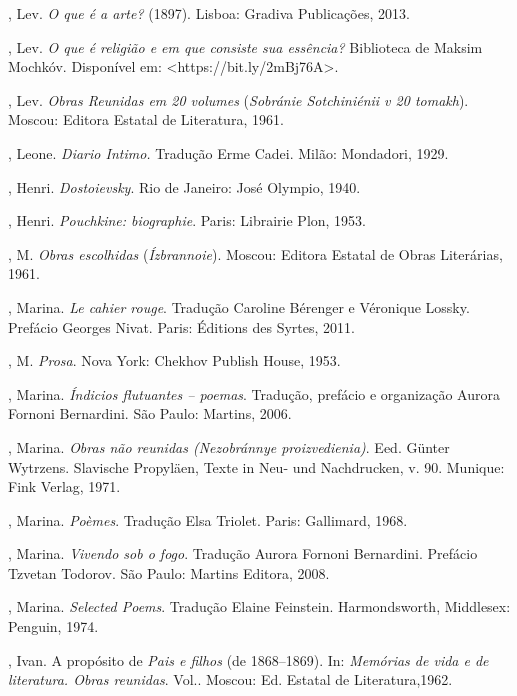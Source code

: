 \begin{Parskip}
{, Lev. \emph{O que é a arte?} (1897). Lisboa: Gradiva Publicações, 2013.

, Lev. \emph{O que é religião e em que consiste sua essência?} Biblioteca de Maksim Mochkóv.
Disponível em: \textless{}https://bit.ly/2mBj76A\textgreater{}.

, Lev. \emph{Obras Reunidas em 20 volumes} (\emph{Sobránie Sotchiniénii v 20 tomakh}). Moscou: Editora Estatal de Literatura, 1961.

, Leone. \emph{Diario Intimo.} Tradução Erme Cadei. Milão: Mondadori, 1929.

, Henri. \emph{Dostoievsky}. Rio de Janeiro: José Olympio, 1940.

, Henri. \emph{Pouchkine: biographie}. Paris: Librairie Plon,
1953.

, M. \emph{Obras escolhidas} (\emph{Ízbrannoie}). Moscou: Editora Estatal de Obras Literárias, 1961.

, Marina. \emph{Le cahier rouge}. Tradução Caroline Bérenger e Véronique Lossky. Prefácio
Georges Nivat. Paris: Éditions des Syrtes, 2011.

, M. \emph{Prosa}. Nova York: Chekhov Publish House, 1953.

, Marina. \emph{Índicios flutuantes -- poemas}. Tradução, prefácio e organização Aurora Fornoni Bernardini. São Paulo: Martins, 2006.

, Marina. \emph{Obras não reunidas (Nezobránnye proizvedienia)}. Eed. Günter Wytrzens. Slavische Propyläen, Texte in Neu- und Nachdrucken, v. 90. Munique: Fink Verlag, 1971.

, Marina. \emph{Poèmes}. Tradução Elsa Triolet. Paris: Gallimard, 1968.

, Marina. \emph{Vivendo sob o fogo}. Tradução Aurora Fornoni Bernardini. Prefácio Tzvetan Todorov. São Paulo: Martins Editora, 2008.

, Marina. \emph{Selected Poems}. Tradução Elaine Feinstein. Harmondsworth, Middlesex: Penguin, 1974.

, Ivan. A propósito de \emph{Pais e filhos} (de 1868--1869). In: \emph{Memórias de vida e de literatura. Obras reunidas}. Vol.. Moscou: Ed. Estatal de Literatura,1962.

}
\end{Parskip}
